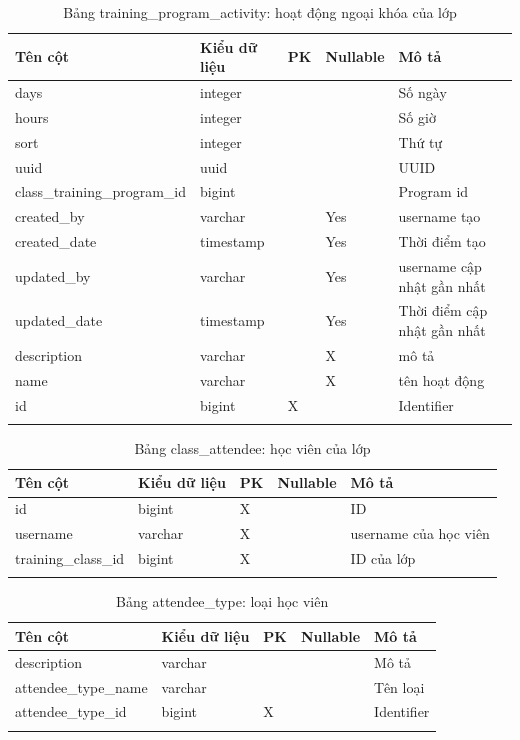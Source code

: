 \documentclass[report.tex]{subfiles}
\begin{document}
\begin{table}[!htb]
\begin{longtable}{|p{3cm}|p{3cm}|p{1cm}|p{1.6cm}|p{6cm}|}
\hline
\textbf{Tên cột} & \textbf{Kiểu dữ liệu} & \textbf{PK} & \textbf{Nullable} & \textbf{Mô tả} \\
\hline
days & integer & & & Số ngày \\
hours & integer & & & Số giờ \\
sort & integer & & & Thứ tự \\
uuid & uuid & & & UUID \\
class\_training\_program\_id & bigint & & & Program id \\
created\_by & varchar & & Yes & username tạo \\
created\_date & timestamp & & Yes & Thời điểm tạo \\
updated\_by & varchar & & Yes & username cập nhật gần nhất \\
updated\_date & timestamp & & Yes & Thời điểm cập nhật gần nhất \\
description & varchar & & X & mô tả \\
name & varchar & & X & tên hoạt động \\
id & bigint & X & & Identifier \\
\hline
\caption[Bảng training\_program\_activity]{Bảng training\_program\_activity: hoạt động ngoại khóa của lớp}
\end{longtable}
\end{table}
\FloatBarrier

\pagebreak %

\begin{table}[!htb]
\begin{longtable}{|p{3cm}|p{3cm}|p{1cm}|p{1.6cm}|p{6cm}|}
\hline
\textbf{Tên cột} & \textbf{Kiểu dữ liệu} & \textbf{PK} & \textbf{Nullable} & \textbf{Mô tả} \\
\hline
id & bigint & X & & ID \\
\hline
username & varchar & X & & username của học viên \\
\hline
training\_class\_id & bigint & X & & ID của lớp \\
\hline
\caption[Bảng class\_attendee]{Bảng class\_attendee: học viên của lớp}
\end{longtable}
\end{table}
\FloatBarrier

\begin{table}[!htb]
\begin{longtable}{|p{3cm}|p{3cm}|p{1cm}|p{1.6cm}|p{6cm}|}
\hline
\textbf{Tên cột} & \textbf{Kiểu dữ liệu} & \textbf{PK} & \textbf{Nullable} & \textbf{Mô tả} \\
\hline
description & varchar & & & Mô tả \\
attendee\_type\_name & varchar & & & Tên loại \\
attendee\_type\_id & bigint & X & & Identifier \\
\hline
\caption[Bảng attendee\_type]{Bảng attendee\_type: loại học viên}
\end{longtable}
\end{table}
\FloatBarrier
\end{document}
